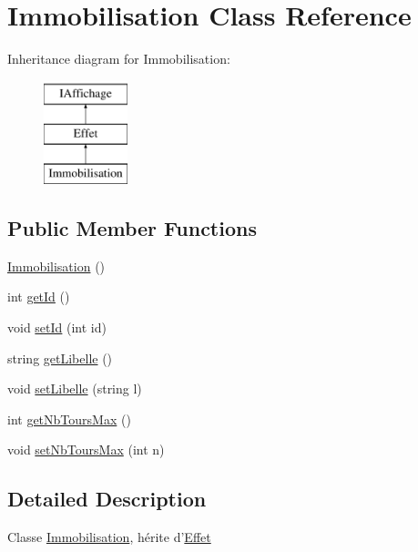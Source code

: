 \hypertarget{class_immobilisation}{\section{\-Immobilisation \-Class \-Reference}
\label{class_immobilisation}
}
\-Inheritance diagram for \-Immobilisation\-:\begin{figure}[H]
\begin{center}
\leavevmode
\includegraphics[height=3.000000cm]{class_immobilisation}
\end{center}
\end{figure}
\subsection*{\-Public \-Member \-Functions}
\begin{DoxyCompactItemize}
\item 
\hyperlink{class_immobilisation_a87ac7ebcbabd1cadc063254aec060958}{\-Immobilisation} ()
\item 
int \hyperlink{class_immobilisation_a4ffaa8356838b9bc202e16136bed7c93}{get\-Id} ()
\item 
void \hyperlink{class_immobilisation_a1b0d3098ec798b0c8d46ff51aa0c0db2}{set\-Id} (int id)
\item 
string \hyperlink{class_immobilisation_a77ed10535746670f2e0cdfcf385884a2}{get\-Libelle} ()
\item 
void \hyperlink{class_immobilisation_a32e8e9379388f0a492fe0fd97ec9c304}{set\-Libelle} (string l)
\item 
int \hyperlink{class_immobilisation_ae0baa3a4c8e7e39ba0646c5afda69ce8}{get\-Nb\-Tours\-Max} ()
\item 
void \hyperlink{class_immobilisation_a2b4a2b1ee2ef7b0e11ca3cf92ec4caad}{set\-Nb\-Tours\-Max} (int n)
\end{DoxyCompactItemize}


\subsection{\-Detailed \-Description}
\-Classe \hyperlink{class_immobilisation}{\-Immobilisation}, hérite d'\hyperlink{class_effet}{\-Effet} 

